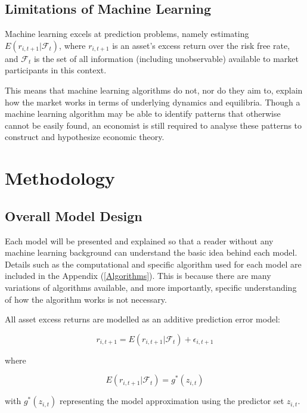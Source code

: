 \documentclass[a4paper]{article}
\newcommand{\smalltodo}[2][] {\todo[caption={#2}, size=\scriptsize,%
	fancyline,#1]{\begin{spacing}{.5}#2\end{spacing}}}
\newcommand{\rhs}[2][]{\smalltodo[color=green!30,#1]{{\bf RS:} #2}}
\begin{document}
\rhs{Pending}

\subsection{Limitations of Machine Learning}

Machine learning excels at prediction problems, namely estimating \( E(r_{i, t+1}|\mathcal{F}_t) \), where \( r_{i, t+1} \) is an asset's excess return over the risk free rate, and \( \mathcal{F}_t \) is the set of all information (including unobservable) available to market participants in this context.

This means that machine learning algorithms do not, nor do they aim to, explain how the market works in terms of underlying dynamics and equilibria. Though a machine learning algorithm may be able to identify patterns that otherwise cannot be easily found, an economist is still required to analyse these patterns to construct and hypothesize economic theory.

\section{Methodology}

\subsection{Overall Model Design}

Each model will be presented and explained so that a reader without any machine learning background can understand the basic idea behind each model. Details such as the computational and specific algorithm used for each model are included in the Appendix (\ref{Algorithms}). This is because there are many variations of algorithms available, and more importantly, specific understanding of how the algorithm works is not necessary. 

All asset excess returns are modelled as an additive prediction error model:

\begin{equation}
	r_{i, t+1} = E(r_{i, t+1} | \mathcal{F}_t) + \epsilon_{i, t+1}
\end{equation}

where 

\begin{equation}
	E(r_{i, t+1} | \mathcal{F}_t) = g^*(z_{i,t})
\end{equation}

with $g^*(z_{i,t})$ representing the model approximation using the predictor set $z_{i,t}$.
\end{document}
